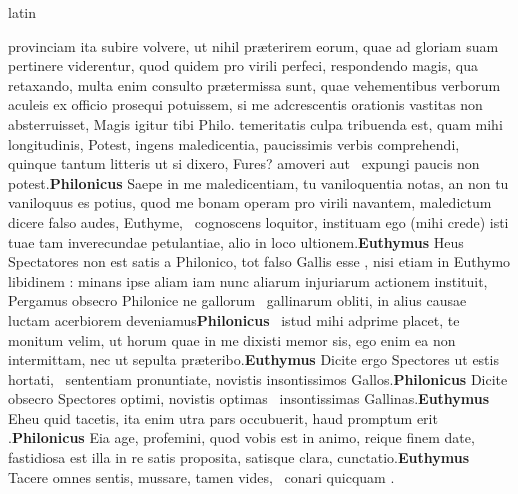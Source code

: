 \documentclass[12pt]{book}
\renewenvironment{latin}
    	{\begin{hyphenrules}{latin}}
    	{\end{hyphenrules}}
\begin{document}
\begin{pages}
\begin{latin}
\begin{Leftside}
            provinciam ita subire volvere, ut nihil præterirem eorum, quae ad gloriam suam pertinere viderentur, quod quidem pro virili perfeci, respondendo
            magis, qua retaxando, multa enim consulto prætermissa sunt, quae 
            vehementibus verborum aculeis ex officio prosequi potuissem, si
            me adcrescentis orationis vastitas non absterruisset, Magis igitur
            tibi Philo. temeritatis culpa tribuenda est, quam mihi longitudinis, 
            Potest, ingens maledicentia, paucissimis verbis comprehendi, 
            quinque tantum litteris ut si dixero, Fures? amoveri aut ﻿\ampersand\ expungi paucis non potest.\pend\pstart\textbf{Philonicus }\hspace{1cm} Saepe in me maledicentiam, tu vaniloquentia notas, an non tu vaniloquus es potius, quod me bonam 
            operam pro virili navantem, maledictum dicere falso audes, 
            Euthyme, ﻿\ampersand\ cognoscens loquitor, instituam ego (mihi crede) isti
            tuae tam inverecundae petulantiae, alio in loco ultionem.\pend\pstart\textbf{Euthymus }\hspace{1cm} Heus Spectatores non est satis a Philonico, tot falso Gallis esse , 
            nisi etiam in Euthymo libidinem : minans ipse aliam iam nunc
            aliarum injuriarum actionem instituit, Pergamus obsecro Philonice ne gallorum ﻿\ampersand\ gallinarum obliti, in alius causae luctam acerbiorem deveniamus\pend\pstart\textbf{Philonicus }\hspace{1cm} ﻿\ampersand\ istud mihi adprime placet,  te monitum velim, ut horum quae in me dixisti memor sis, ego enim ea non intermittam, nec ut sepulta præteribo.\pend\pstart\textbf{Euthymus }\hspace{1cm} Dicite ergo Spectores ut estis hortati, ﻿\ampersand\ sententiam pronuntiate, novistis insontissimos Gallos.\pend\pstart\textbf{Philonicus }\hspace{1cm} Dicite obsecro Spectores optimi, novistis optimas ﻿\ampersand\ insontissimas Gallinas.\pend\pstart\textbf{Euthymus }\hspace{1cm} Eheu quid tacetis, ita enim utra pars occubuerit, haud promptum erit .\pend\pstart\textbf{Philonicus }\hspace{1cm} Eia age, profemini, quod vobis est in animo, reique finem date, fastidiosa est illa in re satis proposita, satisque clara, cunctatio.\pend\pstart\textbf{Euthymus }\hspace{1cm} Tacere omnes sentis, mussare, tamen vides, ﻿\ampersand\ conari quicquam . 

\end{Leftside}
\end{latin}
\end{pages}
\end{document}
